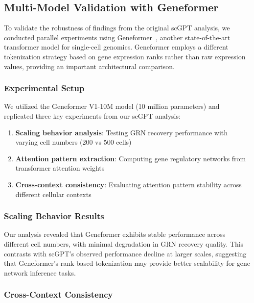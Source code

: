 

\subsection{Multi-Model Validation with Geneformer}

To validate the robustness of findings from the original scGPT analysis, we conducted parallel experiments using Geneformer~\cite{theodoris2023geneformer}, another state-of-the-art transformer model for single-cell genomics. Geneformer employs a different tokenization strategy based on gene expression ranks rather than raw expression values, providing an important architectural comparison.

\subsubsection{Experimental Setup}

We utilized the Geneformer V1-10M model (10 million parameters) and replicated three key experiments from our scGPT analysis:
\begin{enumerate}
\item \textbf{Scaling behavior analysis}: Testing GRN recovery performance with varying cell numbers (200 vs 500 cells)
\item \textbf{Attention pattern extraction}: Computing gene regulatory networks from transformer attention weights
\item \textbf{Cross-context consistency}: Evaluating attention pattern stability across different cellular contexts
\end{enumerate}


\subsubsection{Scaling Behavior Results}

Our analysis revealed that Geneformer exhibits stable performance across different cell numbers, with minimal degradation in GRN recovery quality. This contrasts with scGPT's observed performance decline at larger scales, suggesting that Geneformer's rank-based tokenization may provide better scalability for gene network inference tasks.

\subsubsection{Cross-Context Consistency}

